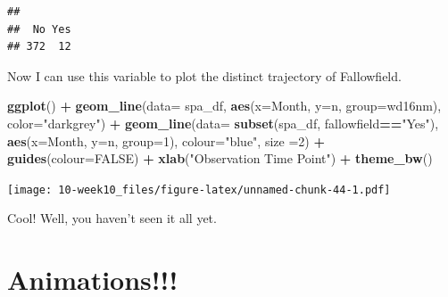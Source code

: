 \documentclass[]{book}
\newenvironment{Shaded}{\begin{snugshade}}{\end{snugshade}}
\newcommand{\DataTypeTok}[1]{\textcolor[rgb]{0.13,0.29,0.53}{#1}}
\newcommand{\DecValTok}[1]{\textcolor[rgb]{0.00,0.00,0.81}{#1}}
\newcommand{\KeywordTok}[1]{\textcolor[rgb]{0.13,0.29,0.53}{\textbf{#1}}}
\newcommand{\NormalTok}[1]{#1}
\newcommand{\OperatorTok}[1]{\textcolor[rgb]{0.81,0.36,0.00}{\textbf{#1}}}
\newcommand{\OtherTok}[1]{\textcolor[rgb]{0.56,0.35,0.01}{#1}}
\newcommand{\StringTok}[1]{\textcolor[rgb]{0.31,0.60,0.02}{#1}}
\begin{document}
\begin{Shaded}
\end{Shaded}

\begin{verbatim}
## 
##  No Yes 
## 372  12
\end{verbatim}

Now I can use this variable to plot the distinct trajectory of Fallowfield.

\begin{Shaded}
\begin{Highlighting}[]
\KeywordTok{ggplot}\NormalTok{() }\OperatorTok{+}\StringTok{ }
\StringTok{  }\KeywordTok{geom_line}\NormalTok{(}\DataTypeTok{data=}\NormalTok{ spa_df, }\KeywordTok{aes}\NormalTok{(}\DataTypeTok{x=}\NormalTok{Month, }\DataTypeTok{y=}\NormalTok{n, }\DataTypeTok{group=}\NormalTok{wd16nm), }\DataTypeTok{color=}\StringTok{"darkgrey"}\NormalTok{) }\OperatorTok{+}
\StringTok{   }\KeywordTok{geom_line}\NormalTok{(}\DataTypeTok{data=} \KeywordTok{subset}\NormalTok{(spa_df, fallowfield}\OperatorTok{==}\StringTok{"Yes"}\NormalTok{), }\KeywordTok{aes}\NormalTok{(}\DataTypeTok{x=}\NormalTok{Month, }\DataTypeTok{y=}\NormalTok{n, }\DataTypeTok{group=}\DecValTok{1}\NormalTok{),}
             \DataTypeTok{colour=}\StringTok{"blue"}\NormalTok{, }\DataTypeTok{size =}\DecValTok{2}\NormalTok{) }\OperatorTok{+}
\StringTok{  }\KeywordTok{guides}\NormalTok{(}\DataTypeTok{colour=}\OtherTok{FALSE}\NormalTok{) }\OperatorTok{+}\StringTok{ }\KeywordTok{xlab}\NormalTok{(}\StringTok{"Observation Time Point"}\NormalTok{) }\OperatorTok{+}\StringTok{ }
\StringTok{  }\KeywordTok{theme_bw}\NormalTok{()}
\end{Highlighting}
\end{Shaded}

\texttt{[image: 10-week10\_files/figure-latex/unnamed-chunk-44-1.pdf]}

Cool! Well, you haven't seen it all yet.

\hypertarget{animations}{%
\section{Animations!!!}\label{animations}}
\end{document}

